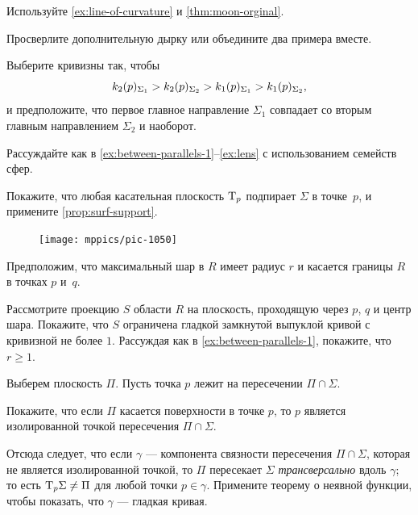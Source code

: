 \begin{multicols}{2}
Используйте \ref{ex:line-of-curvature} и \ref{thm:moon-orginal}.

Просверлите дополнительную дырку или объедините два примера вместе.



\setcounter{eqtn}{0}

Выберите кривизны так, чтобы 
\[k_2(p)_{\Sigma_1}\z>k_2(p)_{\Sigma_2}> k_1(p)_{\Sigma_1}> k_1(p)_{\Sigma_2},\]
и предположите, что первое главное направление $\Sigma_1$ совпадает со вторым главным направлением $\Sigma_2$ и наоборот.

Рассуждайте как в \ref{ex:between-parallels-1}--\ref{ex:lens} с использованием семейств сфер.

Покажите, что любая касательная плоскость $\mathrm{T}_p$ подпирает $\Sigma$ в точке~$p$,
и примените \ref{prop:surf-support}.


{

\begin{figure}
\vskip-6mm
\centering
\texttt{[image: mppics/pic-1050]}
\vskip-0mm
\end{figure}

Предположим, что максимальный шар в $R$ имеет радиус $r$ и касается границы $R$ в точках $p$ и~$q$.

Рассмотрите проекцию $S$ области $R$ на плоскость, проходящую через $p$, $q$ и центр шара.
Покажите, что $S$ ограничена гладкой замкнутой выпуклой кривой с кривизной не более $1$.
Рассуждая как в \ref{ex:between-parallels-1}, покажите, что $r\ge 1$.

}

Выберем плоскость $\Pi$.
Пусть точка $p$ лежит на пересечении $\Pi\cap\Sigma$.

Покажите, что если $\Pi$ касается поверхности в точке $p$, то $p$ является изолированной точкой пересечения $\Pi\cap\Sigma$.

Отсюда следует, что если $\gamma$ --- компонента связности пересечения $\Pi\cap\Sigma$, которая не является изолированной точкой, то $\Pi$ пересекает $\Sigma$ \emph{трансверсально} вдоль $\gamma$; то есть $\mathrm{T}_p\Sigma\ne\Pi$ для любой точки $p \in \gamma$. Примените теорему о неявной функции, чтобы показать, что $\gamma$ --- гладкая кривая.


\end{multicols}
